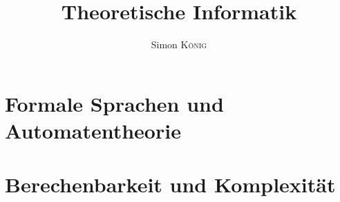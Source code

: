 \documentclass[orange]{simonkoenigzusammenfassung}
\title{Theoretische Informatik\\\subtitleformat{Zusammenfassung zu den Modulen Theoretische Informatik I}}
\author{Simon \textsc{König}}
\begin{document}
\maketitle
\tableofcontents

\part{Formale Sprachen und Automatentheorie}

\part{Berechenbarkeit und Komplexität}
\end{document}
